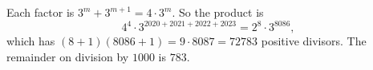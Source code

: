 Each factor is $3^m+3^{m+1}=4\cdot3^m$. So the product is
\[4^4\cdot3^{2020+2021+2022+2023}=2^8\cdot3^{8086},\]
which has $(8+1)(8086+1)=9\cdot8087=72783$ positive divisors. The remainder on division by $1000$ is $\boxed{783}$.
